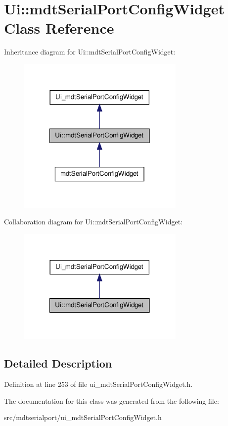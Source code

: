 \hypertarget{class_ui_1_1mdt_serial_port_config_widget}{
\section{Ui::mdtSerialPortConfigWidget Class Reference}
\label{class_ui_1_1mdt_serial_port_config_widget}
}


Inheritance diagram for Ui::mdtSerialPortConfigWidget:\nopagebreak
\begin{figure}[H]
\begin{center}
\leavevmode
\includegraphics[width=230pt]{class_ui_1_1mdt_serial_port_config_widget__inherit__graph}
\end{center}
\end{figure}


Collaboration diagram for Ui::mdtSerialPortConfigWidget:\nopagebreak
\begin{figure}[H]
\begin{center}
\leavevmode
\includegraphics[width=230pt]{class_ui_1_1mdt_serial_port_config_widget__coll__graph}
\end{center}
\end{figure}


\subsection{Detailed Description}


Definition at line 253 of file ui\_\-mdtSerialPortConfigWidget.h.



The documentation for this class was generated from the following file:\begin{DoxyCompactItemize}
\item 
src/mdtserialport/ui\_\-mdtSerialPortConfigWidget.h\end{DoxyCompactItemize}
